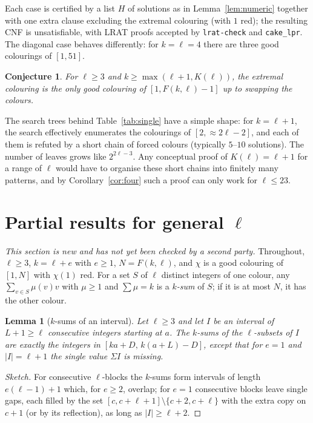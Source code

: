 \documentclass[11pt]{amsart}
\newtheorem{lemma}[theorem]{Lemma}
\newtheorem{conjecture}[theorem]{Conjecture}
\theoremstyle{definition}
\newcommand{\F}{F}
\begin{document}
\noindent Each case is certified by a list $H$ of solutions as in Lemma~\ref{lem:numeric} together with one extra clause excluding the extremal colouring (with $1$ red); the resulting CNF is unsatisfiable, with LRAT proofs accepted by \texttt{lrat-check} and \texttt{cake\_lpr}. The diagonal case behaves differently: for $k=\ell=4$ there are three good colourings of $[1,51]$.

\begin{conjecture}\label{conj:unique}
For $\ell\ge3$ and $k\ge\max(\ell+1,K(\ell))$, the extremal colouring is the only good colouring of $[1,\F(k,\ell)-1]$ up to swapping the colours.
\end{conjecture}

\noindent The search trees behind Table~\ref{tab:single} have a simple shape: for $k=\ell+1$, the search effectively enumerates the colourings of $[2,\approx2\ell-2]$, and each of them is refuted by a short chain of forced colours (typically $5$--$10$ solutions). The number of leaves grows like $2^{2\ell-3}$. Any conceptual proof of $K(\ell)=\ell+1$ for a range of $\ell$ would have to organise these short chains into finitely many patterns, and by Corollary~\ref{cor:four} such a proof can only work for $\ell\le23$.

\section{Partial results for general $\ell$}\label{sec:general}

\noindent\emph{This section is new and has not yet been checked by a second party.} Throughout, $\ell\ge3$, $k=\ell+e$ with $e\ge1$, $N=\F(k,\ell)$, and $\chi$ is a good colouring of $[1,N]$ with $\chi(1)$ red. For a set $S$ of $\ell$ distinct integers of one colour, any $\sum_{v\in S}\mu(v)v$ with $\mu\ge1$ and $\sum\mu=k$ is a \emph{$k$-sum} of $S$; if it is at most $N$, it has the other colour.

\begin{lemma}[$k$-sums of an interval]\label{lem:interval}
Let $\ell\ge3$ and let $I$ be an interval of $L+1\ge\ell$ consecutive integers starting at $a$. The $k$-sums of the $\ell$-subsets of $I$ are exactly the integers in $[ka+D,\,k(a+L)-D]$, except that for $e=1$ and $|I|=\ell+1$ the single value $\Sigma I$ is missing.
\end{lemma}

\begin{proof}[Sketch]
For consecutive $\ell$-blocks the $k$-sums form intervals of length $e(\ell-1)+1$ which, for $e\ge2$, overlap; for $e=1$ consecutive blocks leave single gaps, each filled by the set $[c,c+\ell+1]\setminus\{c+2,c+\ell\}$ with the extra copy on $c+1$ (or by its reflection), as long as $|I|\ge\ell+2$.
\end{proof}
\end{document}
